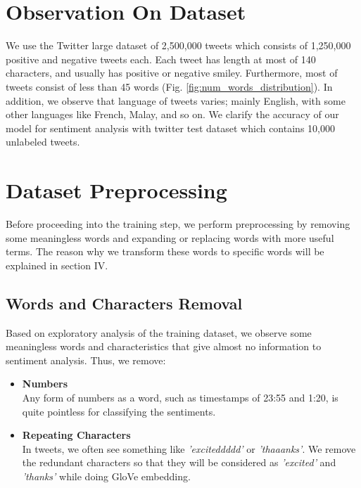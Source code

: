 \documentclass[10pt,conference,compsocconf]{IEEEtran}
\begin{document}
\section{Observation On Dataset}
We use the Twitter large dataset of 2,500,000 tweets which consists of 1,250,000 positive and negative tweets each. Each tweet has length at most of 140 characters, and usually has positive or negative smiley. Furthermore, most of tweets consist of less than 45 words (Fig. \ref{fig:num_words_distribution}). In addition, we observe that language of tweets varies; mainly English, with some other languages like French, Malay, and so on. We clarify the accuracy of our model for sentiment analysis with twitter test dataset which contains 10,000 unlabeled tweets.

\section{Dataset Preprocessing}
Before proceeding into the training step, we perform preprocessing by removing some meaningless words and expanding or replacing words with more useful terms. The reason why we transform these words to specific words will be explained in section IV. 
\subsection{Words and Characters Removal}
Based on exploratory analysis of the training dataset, we observe some meaningless words and characteristics that give almost no information to sentiment analysis. Thus, we remove: 
\begin{itemize}
\item \textbf{Numbers} \\
Any form of numbers as a word, such as timestamps of 23:55 and 1:20, is quite pointless for classifying the sentiments.
\item \textbf{Repeating Characters} \\
In tweets, we often see something like \textit{'exciteddddd'} or \textit{'thaaanks'}. We remove the redundant characters so that they will be considered as \textit{'excited'} and \textit{'thanks'} while doing GloVe embedding.
\end{itemize}
\end{document}
